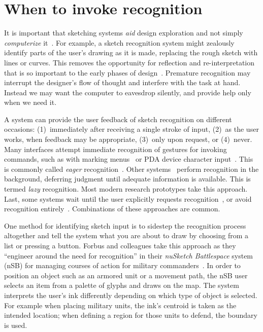 \section{When to invoke recognition}
\label{sec:recognition-when}

It is important that sketching systems \textit{aid} design exploration
and not simply \textit{computerize}
it~\cite{negroponte-soft-arc-mac}. For example, a sketch recognition
system might zealously identify parts of the user's drawing as it is
made, replacing the rough sketch with lines or curves. This removes
the opportunity for reflection and re-interpretation that is so
important to the early phases of
design~\cite{schon-reflective,goldschmidt-dialectics,terry-creative-ui}. Premature
recognition may interrupt the designer's flow of thought and interfere
with the task at hand. Instead we may want the computer to eavesdrop
silently, and provide help only when we need it.

A system can provide the user feedback of sketch recognition on
different occasions: (1)~immediately after receiving a single stroke
of input, (2)~as the user works, when feedback may be appropriate,
(3)~only upon request, or (4)~never. Many interfaces attempt immediate
recognition of gestures for invoking commands, such as with marking
menus~\cite{kurtenbach-marking-menus} or PDA device character
input~\cite{palm}. This is commonly called \textit{eager}
recognition~\cite{blostein-diagrams-review}. Other
systems~\cite{gross-ecn-uist,igarashi-suggestive,alvarado-sketchread-uist}
perform recognition in the background, deferring judgment until
adequate information is available. This is termed \textit{lazy}
recognition. Most modern research prototypes take this approach. Last,
some systems wait until the user explicitly requests
recognition~\cite{landay-silk}, or avoid recognition
entirely~\cite{forbus-nusketch-battlespace}. Combinations of these
approaches are common.

One method for identifying sketch input is to sidestep the recognition
process altogether and tell the system what you are about to draw by
choosing from a list or pressing a button. Forbus and colleagues take
this approach as they ``engineer around the need for recognition'' in
their \textit{nuSketch Battlespace} system (nSB) for managing courses
of action for military
commanders~\cite{forbus-nusketch-battlespace}. In order to position an
object such as an armored unit or a movement path, the nSB user
selects an item from a palette of glyphs and draws on the map. The
system interprets the user's ink differently depending on which type
of object is selected. For example when placing military units, the
ink's centroid is taken as the intended location; when defining a
region for those units to defend, the boundary is used.

